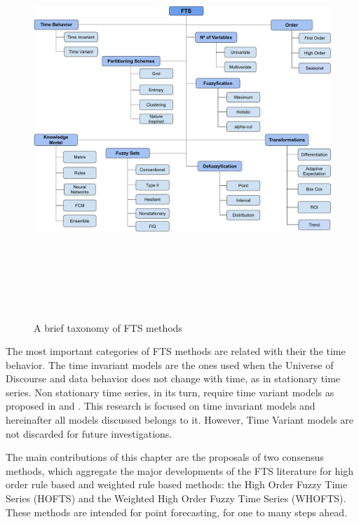 \begin{figure}[htb]
    \centering
    \includegraphics[width=\textwidth, height=15cm]{figures/fts_taxonomy.pdf}
    \caption{A brief taxonomy of FTS methods}
    \label{fig:fts_taxonomy}
\end{figure}

The most important categories of FTS methods are related with their the time behavior. The time invariant models are the ones used when the Universe of Discourse and data behavior  does not change with time, as in stationary time series. Non stationary time series, in its turn, require time variant models as proposed in \cite{Song1994} and \cite{Wong2010}. This research is focused on time invariant models and hereinafter all models discussed belongs to it. However, Time Variant models are not discarded for future investigations.

The main contributions of this chapter are the proposals of two consensus methods, which aggregate the major developments of the FTS literature for high order rule based and weighted rule based methods: the High Order Fuzzy Time Series (HOFTS) and the Weighted High Order Fuzzy Time Series (WHOFTS). These methods are intended for point forecasting, for one to many steps ahead.

